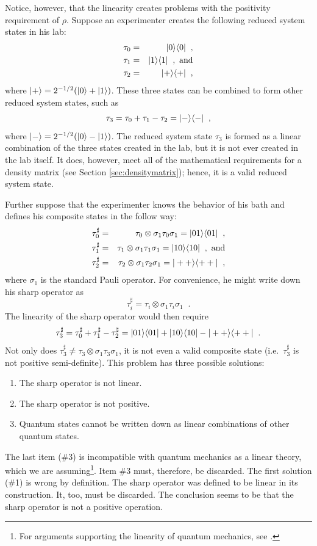 Notice, however, that the linearity creates problems with the positivity requirement of $\rho$.  Suppose an experimenter creates the following reduced system states in his lab:
\begin{eqnarray*}
\tau_0 &=& |0\rangle\langle0|\;\;,\\
\tau_1 &=& |1\rangle\langle1|\;\;,\textrm{ and}\\
\tau_2 &=& |+\rangle\langle+|\;\;,
\end{eqnarray*}
where $\left|+\right\rangle=2^{-1/2}(\left|0\right\rangle+\left|1\right\rangle)$.  These three states can be combined to form other reduced system states, such as
$$
\tau_3 = \tau_0+\tau_1-\tau_2 = |-\rangle\langle-|\;\;,
$$
where $\left|-\right\rangle=2^{-1/2}(\left|0\right\rangle-\left|1\right\rangle)$.  The reduced system state $\tau_3$ is formed as a linear combination of the three states created in the lab, but it is not ever created in the lab itself.  It does, however, meet all of the mathematical requirements for a density matrix (see Section \ref{sec:densitymatrix}); hence, it is a valid reduced system state.

Further suppose that the experimenter knows the behavior of his bath and defines his composite states in the follow way:
\begin{eqnarray*}
\tau_0^\sharp &=& \tau_0\otimes\sigma_1\tau_0\sigma_1 = |01\rangle\langle01|\;\;,\\
\tau_1^\sharp &=& \tau_1\otimes\sigma_1\tau_1\sigma_1 = |10\rangle\langle10|\;\;,\textrm{ and}\\
\tau_2^\sharp &=& \tau_2\otimes\sigma_1\tau_2\sigma_1 = |++\rangle\langle++|\;\;,
\end{eqnarray*}
where $\sigma_1$ is the standard Pauli operator.  For convenience, he might write down his sharp operator as
$$
\tau_i^\sharp = \tau_i \otimes \sigma_1\tau_i\sigma_1\;\;.
$$
The linearity of the sharp operator would then require
$$
\tau_3^\sharp = \tau_0^\sharp+\tau_1^\sharp-\tau_2^\sharp = |01\rangle\langle01|+|10\rangle\langle10|-|++\rangle\langle++|\;\;.
$$
Not only does $\tau_3^\sharp \neq  \tau_3 \otimes \sigma_1\tau_3\sigma_1$, it is not even a valid composite state (i.e.\ $\tau_3^\sharp$ is not positive semi-definite).  This problem has three possible solutions:
\begin{enumerate}
\item The sharp operator is not linear.
\item The sharp operator is not positive.
\item Quantum states cannot be written down as linear combinations of other quantum states.
\end{enumerate}
The last item (\#3) is incompatible with quantum mechanics as a linear theory, which we are assuming\footnote{For arguments supporting the linearity of quantum mechanics, see \cite{Rodriguez2010,Alicki2001}.}.  Item \#3 must, therefore, be discarded.  The first solution (\#1) is wrong by definition.  The sharp operator was defined to be linear in its construction.  It, too, must be discarded.  The conclusion seems to be that the sharp operator is not a positive operation.


